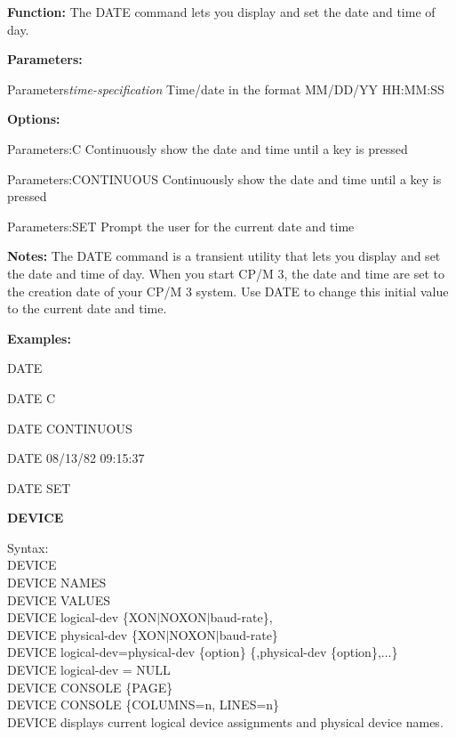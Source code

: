 \textbf{Function:} The DATE command lets you display and set the date
and time of day.

\textbf{Parameters:}
\begin{labeledpar}{Parameters}{\textit{time-specification}}
  Time/date in the format MM/DD/YY HH:MM:SS
\end{labeledpar}

\textbf{Options:}
\begin{labeledpar}{Parameters:}{C}
  Continuously show the date and time until a key is pressed
\end{labeledpar}
\begin{labeledpar}{Parameters:}{CONTINUOUS}
  Continuously show the date and time until a key is pressed
\end{labeledpar}
\begin{labeledpar}{Parameters:}{SET}
  Prompt the user for the current date and time
\end{labeledpar}

\textbf{Notes:} The DATE command is a transient utility that lets you
display and set the date and time of day.  When you start CP/M 3, the
date and time are set to the creation date of your CP/M 3 system. Use
DATE to change this initial value to the current date and time.

\textbf{Examples:}

DATE

DATE C

DATE CONTINUOUS

DATE 08/13/82 09:15:37

DATE SET

\textbf{DEVICE}

\hangindent=0.7cm Syntax:\\
DEVICE\\
DEVICE NAMES\\
DEVICE VALUES\\
DEVICE logical-dev \{XON\(|\)NOXON\(|\)baud-rate\},\\
DEVICE physical-dev \{XON\(|\)NOXON\(|\)baud-rate\}\\
DEVICE logical-dev=physical-dev \{option\} \{,physical-dev \{option\},...\}\\
DEVICE logical-dev = NULL\\
DEVICE CONSOLE \{PAGE\}\\
DEVICE CONSOLE \{COLUMNS=n, LINES=n\}\\

DEVICE displays current logical device assignments and physical device
names.

